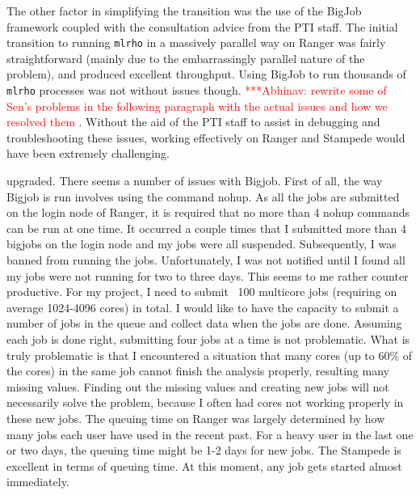 \documentclass{sig-alternate}
\newcommand{\abhi}[1]{ {\textcolor{red} { ***Abhinav: #1 }}}
\newcommand{\abhi}[1]{ {}}
\newcommand{\ty}{\texttt}
\begin{document}
The other factor in simplifying  the transition was the use of the BigJob framework coupled with the
consultation advice from the PTI staff. The initial transition to running \ty{mlrho} in a massively parallel
way on Ranger was fairly straightforward (mainly due to the embarrassingly parallel nature of the problem),
and produced excellent throughput. Using BigJob to run thousands of \ty{mlrho} processes was not without
issues though. \abhi{rewrite some of Sen's problems in the following paragraph with the actual issues and how
  we resolved them}. Without the aid of the PTI staff to assist in debugging and troubleshooting these issues,
working effectively on Ranger and Stampede would have been extremely challenging.

upgraded. There seems a number of issues with Bigjob. First of all, the way Bigjob is run involves using the
command nohup. As all the jobs are submitted on the login node of Ranger, it is required that no more than 4
nohup commands can be run at one time. It occurred a couple times that I submitted more than 4 bigjobs on the
login node and my jobs were all suspended. Subsequently, I was banned from running the jobs. Unfortunately, I
was not notified until I found all my jobs were not running for two to three days. This seems to me rather
counter productive. For my project, I need to submit ~100 multicore jobs (requiring on average 1024-4096
cores) in total. I would like to have the capacity to submit a number of jobs in the queue and collect data
when the jobs are done. Assuming each job is done right, submitting four jobs at a time is not
problematic. What is truly problematic is that I encountered a situation that many cores (up to 60\% of the
cores) in the same job cannot finish the analysis properly, resulting many missing values. Finding out the
missing values and creating new jobs will not necessarily solve the problem, because I often had cores not
working properly in these new jobs.  The queuing time on Ranger was largely determined by how many jobs each
user have used in the recent past. For a heavy user in the last one or two days, the queuing time might be 1-2
days for new jobs. The Stampede is excellent in terms of queuing time. At this moment, any job gets started
almost immediately.
\end{document}
